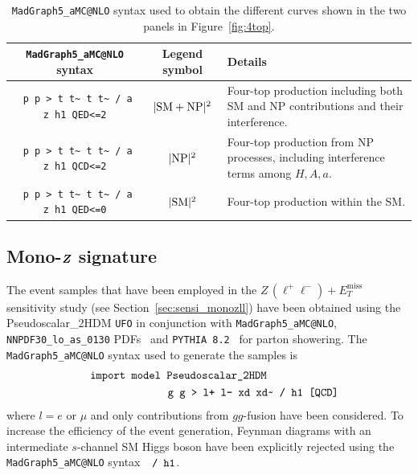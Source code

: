 \documentclass[a4paper, 11pt,notoc]{article}
\newcommand{\MET}{\ensuremath{E_T^\mathrm{miss}}\xspace}
\def\bm#1{\mbox{\boldmath$#1$\unboldmath}}
\begin{document}
\begin{table}[t!]
\begin{tabular}{ccm{50mm}}
\toprule
 {\tt MadGraph5\_aMC@NLO} syntax & Legend symbol & Details \\\midrule
\verb| p p > t t~ t t~ / a z h1 QED<=2|& $|{\rm SM}+{\rm NP}|^2$ & Four-top
production including both SM and NP contributions and their
interference. \\\midrule
\verb| p p > t t~ t t~ / a z h1 QCD<=2|& $|{\rm NP}|^2$ & Four-top
production from NP processes, including interference terms among
$H,A,a$. \\\midrule
\verb| p p > t t~ t t~ / a z h1 QED<=0|& $|{\rm SM}|^2$ & Four-top 
production within the SM.\\
\bottomrule
\end{tabular}
\vspace{4mm} 
\caption{{\tt MadGraph5\_aMC@NLO} syntax used to obtain the different curves shown in the two panels in Figure~\ref{fig:4top}.}
\label{tab-dmhf-4tops}
\end{table}

\subsection[Mono-$Z$ signature]{Mono-$\bm{Z}$ signature}

The event samples that have been employed in the $Z \, (\ell^+ \ell^-) + \MET$ sensitivity study (see Section~\ref{sec:sensi_monozll}) have been obtained using the Pseudoscalar\_2HDM {\tt UFO} in conjunction with {\tt MadGraph5\_aMC@NLO}, {\tt NNPDF30\_lo\_as\_0130} PDFs~\cite{Ball:2014uwa} and  {\tt PYTHIA~8.2}~\cite{Sjostrand:2014zea} for parton showering.  The {\tt MadGraph5\_aMC@NLO}  syntax used to generate the samples is 
\begin{eqnarray}
&& \verb| import model Pseudoscalar_2HDM | \hspace{2.25cm} \nonumber \\
&& \verb| g g > l+ l- xd xd~ / h1 [QCD] | \nonumber 
\end{eqnarray}
where $l = e$ or $\mu$ and only contributions from $gg$-fusion have been considered.  To increase the efficiency of the event generation, Feynman diagrams with an intermediate $s$-channel SM Higgs boson have been explicitly rejected using the  {\tt MadGraph5\_aMC@NLO} syntax~~$\verb|/ h1|$.
\end{document}
